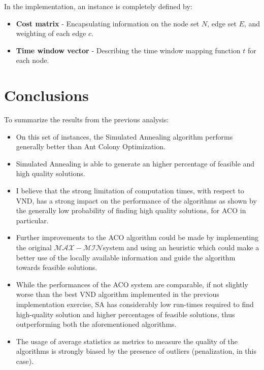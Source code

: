 \documentclass{article}
\newcommand{\maxmin}{$\mathcal{MAX}-\mathcal{MIN}$}
\begin{document}
In the implementation, an instance is completely defined by:
\begin{itemize}
\item \textbf{Cost matrix} - Encapsulating information on the node set $N$, edge set $E$, and weighting of each edge $c$.
\item \textbf{Time window vector} - Describing the time window mapping function $t$ for each node.
\end{itemize}







\section{Conclusions}
To summarize the results from the previous analysis:
\begin{itemize}
  \item On this set of instances, the Simulated Annealing algorithm performs generally better than Ant Colony Optimization.
  \item Simulated Annealing is able to generate an higher percentage of feasible and high quality solutions. 
  \item I believe that the strong limitation of computation times, with respect to VND, has a strong impact on the performance of the algorithms as shown by the generally low probability of finding high quality solutions, for ACO in particular.
  \item Further improvements to the ACO algorithm could be made by implementing the original \maxmin system and using an heuristic which could make a better use of the locally available information and guide the algorithm towards feasible solutions.
  \item While the performances of the ACO system are comparable, if not slightly worse than the best VND algorithm implemented in the previous implementation exercise, SA has considerably low run-times required to find high-quality solution and higher percentages of feasible solutions, thus outperforming both the aforementioned algorithms.
  \item The usage of average statistics as metrics to measure the quality of the algorithms is strongly biased by the presence of outliers (penalization, in this case).
\end{itemize}





\end{document}
